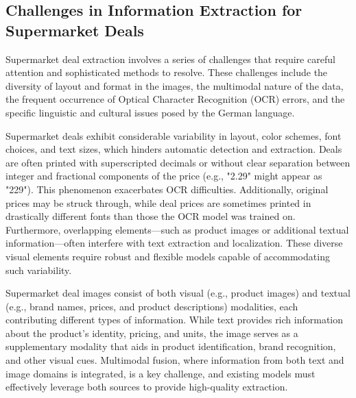\documentclass[11pt]{article}
\begin{document}
\subsection{Challenges in Information Extraction for Supermarket Deals}

Supermarket deal extraction involves a series of challenges that require careful attention and sophisticated methods to resolve. These challenges include the diversity of layout and format in the images, the multimodal nature of the data, the frequent occurrence of Optical Character Recognition (OCR) errors, and the specific linguistic and cultural issues posed by the German language.

Supermarket deals exhibit considerable variability in layout, color schemes, font choices, and text sizes, which hinders automatic detection and extraction. Deals are often printed with superscripted decimals or without clear separation between integer and fractional components of the price (e.g., "2.29" might appear as "229"). This phenomenon exacerbates OCR difficulties. Additionally, original prices may be struck through, while deal prices are sometimes printed in drastically different fonts than those the OCR model was trained on. Furthermore, overlapping elements—such as product images or additional textual information—often interfere with text extraction and localization. These diverse visual elements require robust and flexible models capable of accommodating such variability.

Supermarket deal images consist of both visual (e.g., product images) and textual (e.g., brand names, prices, and product descriptions) modalities, each contributing different types of information. While text provides rich information about the product’s identity, pricing, and units, the image serves as a supplementary modality that aids in product identification, brand recognition, and other visual cues. Multimodal fusion, where information from both text and image domains is integrated, is a key challenge, and existing models must effectively leverage both sources to provide high-quality extraction.
\end{document}

